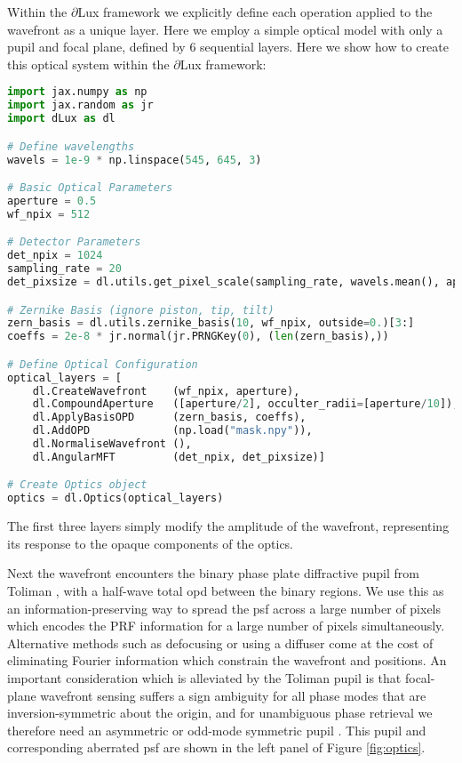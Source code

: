 \documentclass[]{spieman}
\begin{document}
Within the $\partial$Lux framework we explicitly define each operation applied to the wavefront as a unique layer. Here we employ a simple optical model with only a pupil and focal plane, defined by 6 sequential layers. Here we show how to create this optical system within the $\partial$Lux framework:



\begin{lstlisting}[language=Python]
import jax.numpy as np
import jax.random as jr
import dLux as dl

# Define wavelengths
wavels = 1e-9 * np.linspace(545, 645, 3)

# Basic Optical Parameters
aperture = 0.5
wf_npix = 512

# Detector Parameters
det_npix = 1024
sampling_rate = 20
det_pixsize = dl.utils.get_pixel_scale(sampling_rate, wavels.mean(), aperture)

# Zernike Basis (ignore piston, tip, tilt)
zern_basis = dl.utils.zernike_basis(10, wf_npix, outside=0.)[3:]
coeffs = 2e-8 * jr.normal(jr.PRNGKey(0), (len(zern_basis),))

# Define Optical Configuration
optical_layers = [
    dl.CreateWavefront    (wf_npix, aperture),
    dl.CompoundAperture   ([aperture/2], occulter_radii=[aperture/10]),
    dl.ApplyBasisOPD      (zern_basis, coeffs),
    dl.AddOPD             (np.load("mask.npy")),
    dl.NormaliseWavefront (),
    dl.AngularMFT         (det_npix, det_pixsize)]

# Create Optics object
optics = dl.Optics(optical_layers)
\end{lstlisting}

The first three layers simply modify the amplitude of the wavefront, representing its response to the opaque components of the optics. 

Next the wavefront encounters the binary phase plate diffractive pupil from Toliman \cite{tuthill2018}, with a half-wave total \ac{opd} between the binary regions. We use this as an information-preserving way to spread the \ac{psf} across a large number of pixels which encodes the PRF information for a large number of pixels simultaneously. Alternative methods such as defocusing or using a diffuser \cite{Stefansson2017} come at the cost of eliminating Fourier information which constrain the wavefront and positions. An important consideration which is alleviated by the Toliman pupil is that focal-plane wavefront sensing suffers a sign ambiguity for all phase modes that are inversion-symmetric about the origin, and for unambiguous phase retrieval we therefore need an asymmetric or odd-mode symmetric pupil \cite{Martinache2013}. This pupil and corresponding aberrated \ac{psf} are shown in the left panel of Figure \ref{fig:optics}.
\end{document}
